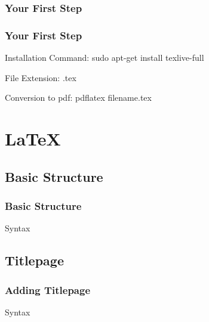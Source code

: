 \documentclass{beamer}
\begin{document}
            \subsubsection{Your First Step}
            \begin{frame}[shrink]
            \frametitle{Your First Step}
            \transfade
                \begin{block}{
                    Installation Command:} sudo apt-get install texlive-full
                \end{block}
                \begin{block}
                    {File Extension:} 
                    .tex
                \end{block}
                \begin{block}{
                    Conversion to pdf:} 
                    pdflatex filename.tex
                \end{block}
            \end{frame}
            
        \section{\LaTeX}

            \subsection{Basic Structure}
                \begin{frame}[shrink]
                \frametitle{Basic Structure}
                \transdissolve
                    \begin{block}{Syntax}
                        
                    \end{block}
                \end{frame}

            \subsection{Titlepage}
                \begin{frame}[shrink]
                \frametitle{Adding Titlepage}
                \transblindsvertical
                    \begin{block}{Syntax}
                        
                    \end{block}
                \end{frame}
\end{document}
